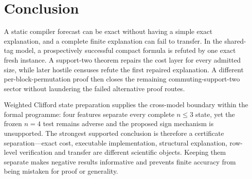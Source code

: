 \section{Conclusion}

A static compiler forecast can be exact without having a simple exact explanation, and a complete finite explanation can fail to transfer.  In the shared-tag model, a prospectively successful compact formula is refuted by one exact fresh instance.  A support-two theorem repairs the cost layer for every admitted size, while later hostile censuses refute the first repaired explanation.  A different per-block-permutation proof then closes the remaining commuting-support-two sector without laundering the failed alternative proof routes.

Weighted Clifford state preparation supplies the cross-model boundary within the formal programme: four features separate every complete $n\le3$ state, yet the frozen $n=4$ test remains adverse and the proposed sign mechanism is unsupported.  The strongest supported conclusion is therefore a certificate separation---exact cost, executable implementation, structural explanation, row-level verification and transfer are different scientific objects.  Keeping them separate makes negative results informative and prevents finite accuracy from being mistaken for proof or generality.
